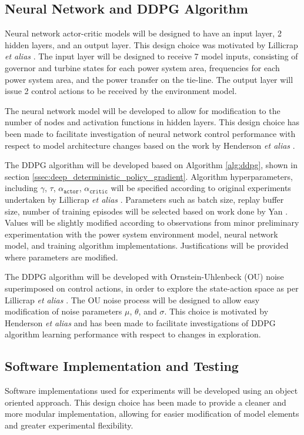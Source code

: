 \subsection{Neural Network and DDPG Algorithm}
Neural network actor-critic models will be designed to have an input layer, 2 hidden layers, and an output layer. This design choice was motivated by Lillicrap \textit{et alias} \cite{Lillicrap2015}. The input layer will be designed to receive 7 model inputs, consisting of governor and turbine states for each power system area, frequencies for each power system area, and the power transfer on the tie-line. The output layer will issue 2 control actions to be received by the environment model.

The neural network model will be developed to allow for modification to the number of nodes and activation functions in hidden layers. This design choice has been made to facilitate investigation of neural network control performance with respect to model architecture changes based on the work by Henderson \textit{et alias} \cite{Henderson2017}.

The DDPG algorithm will be developed based on Algorithm \ref{alg:ddpg}, shown in section \ref{ssec:deep_deterministic_policy_gradient}. Algorithm hyperparameters, including $\gamma$, $\tau$, $\alpha_{\texttt{actor}}$, $\alpha_{\texttt{critic}}$ will be specified according to original experiments undertaken by Lillicrap \textit{et alias} \cite{Lillicrap2015}. Parameters such as batch size, replay buffer size, number of training episodes will be selected based on work done by Yan \cite{Yan2019}. Values will be slightly modified according to observations from minor preliminary experimentation with the power system environment model, neural network model, and training algorithm implementations. Justifications will be provided where parameters are modified.

The DDPG algorithm will be developed with Ornstein-Uhlenbeck (OU) noise superimposed on control actions, in order to explore the state-action space as per Lillicrap \textit{et alias} \cite{Lillicrap2015}. The OU noise process will be designed to allow easy modification of noise parameters $\mu$, $\theta$, and $\sigma$. This choice is motivated by Henderson \textit{et alias} \cite{Henderson2017} and has been made to facilitate investigations of DDPG algorithm learning performance with respect to changes in exploration.


\subsection{Software Implementation and Testing}
Software implementations used for experiments will be developed using an object oriented approach. This design choice has been made to provide a cleaner and more modular implementation, allowing for easier modification of model elements and greater experimental flexibility.

